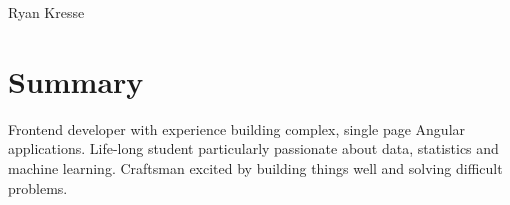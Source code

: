 \documentclass[10pt]{article}
\begin{document}
	\begin{flushleft}
		{\Huge Ryan Kresse}
	\end{flushleft}	%
	
	
	\begin{comment}
		\renewcommand{\abstractname}{Summary}
	
		\begin{abstract}
			Frontend developer with experience building complex, single page Angular applications. Life-long student particularly passionate about data, statistics and machine learning. Craftsman excited by building things well and solving difficult
		problems.
		\end{abstract}
	\end{comment}
	\section{Summary}
		Frontend developer with experience building complex, single page Angular applications. Life-long student particularly passionate about data, statistics and machine learning. Craftsman excited by building things well and solving difficult
		problems.
	
\end{document}
